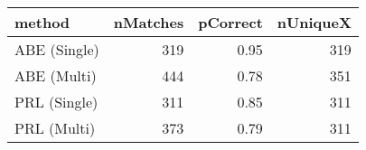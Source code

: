 \begin{tabular}{lrrr}
  \toprule
method & nMatches & pCorrect & nUniqueX \\ 
  \midrule
ABE (Single) & 319 & 0.95 & 319 \\ 
  ABE (Multi) & 444 & 0.78 & 351 \\ 
  PRL (Single) & 311 & 0.85 & 311 \\ 
  PRL (Multi) & 373 & 0.79 & 311 \\ 
   \bottomrule
\end{tabular}
